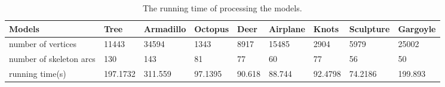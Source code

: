 \begin{table}[htb]

\begin{footnotesize}

\begin{center}

    \begin{tabular}{p{3.0cm} p{1.45cm} p{1.3cm} p{1.3cm} p{1.3cm} p{1.35cm} p{1.5cm} p{1.5cm}p{1.5cm}}

    \hline

     Models& Tree& Armadillo& Octopus& Deer& Airplane& Knots &Sculpture & Gargoyle\\ \hline
     number of vertices & 11443   & 34594   & 1343    & 8917  & 15485 & 2904    & 5979    &25002 \\ \hline
     number of skeleton arcs    &130 & 143 & 81 &77 &60 & 77 &56  &50 \\ \hline
     running time(s)    &197.1732 & 311.559 & 97.1395 &90.618 &88.744 & 92.4798 &74.2186  &199.893 \\
  \hline

    \end{tabular}

\end{center}

\end{footnotesize}

\caption{The running time of processing the models.}\label{tab:ertms:time}

\end{table}




